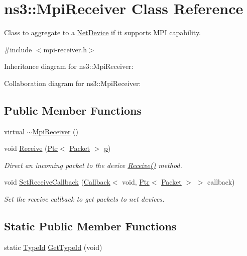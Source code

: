 \hypertarget{classns3_1_1MpiReceiver}{}\section{ns3\+:\+:Mpi\+Receiver Class Reference}
\label{classns3_1_1MpiReceiver}


Class to aggregate to a \hyperlink{classns3_1_1NetDevice}{Net\+Device} if it supports M\+PI capability.  




{\ttfamily \#include $<$mpi-\/receiver.\+h$>$}



Inheritance diagram for ns3\+:\+:Mpi\+Receiver\+:


Collaboration diagram for ns3\+:\+:Mpi\+Receiver\+:
\subsection*{Public Member Functions}
\begin{DoxyCompactItemize}
\item 
virtual \hyperlink{classns3_1_1MpiReceiver_a3283cddad00c962b5a9ebeab234e7959}{$\sim$\+Mpi\+Receiver} ()
\item 
void \hyperlink{classns3_1_1MpiReceiver_a5c5506ca706198f61eaa2e550eca7ff3}{Receive} (\hyperlink{classns3_1_1Ptr}{Ptr}$<$ \hyperlink{classns3_1_1Packet}{Packet} $>$ \hyperlink{lte__link__budget__x2__handover__measures_8m_ac9de518908a968428863f829398a4e62}{p})
\begin{DoxyCompactList}\small\item\em Direct an incoming packet to the device \hyperlink{classns3_1_1MpiReceiver_a5c5506ca706198f61eaa2e550eca7ff3}{Receive()} method. \end{DoxyCompactList}\item 
void \hyperlink{classns3_1_1MpiReceiver_aefe24d1985b7362e270683505a835490}{Set\+Receive\+Callback} (\hyperlink{classns3_1_1Callback}{Callback}$<$ void, \hyperlink{classns3_1_1Ptr}{Ptr}$<$ \hyperlink{classns3_1_1Packet}{Packet} $>$ $>$ callback)
\begin{DoxyCompactList}\small\item\em Set the receive callback to get packets to net devices. \end{DoxyCompactList}\end{DoxyCompactItemize}
\subsection*{Static Public Member Functions}
\begin{DoxyCompactItemize}
\item 
static \hyperlink{classns3_1_1TypeId}{Type\+Id} \hyperlink{classns3_1_1MpiReceiver_a9eb7e7fcb2fcc293b8fc9201d6ac5726}{Get\+Type\+Id} (void)
\end{DoxyCompactItemize}
